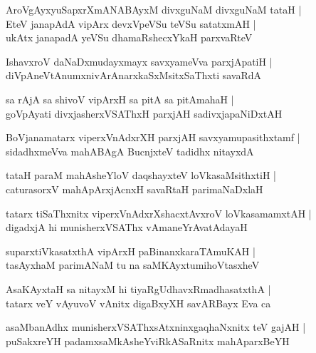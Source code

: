 \documentclass[twoside,12pt,openright]{book}
\newcounter{shloka}[chapter]
\begin{document}
\begin{shloka}
AroVgAyxyuSapxrXmANABAyxM divxguNaM divxguNaM tataH |\\
EteV janapAdA vipArx devxVpeVSu teVSu satatxmAH |\\
ukAtx janapadA yeVSu dhamaRshecxYkaH parxvaRteV
\end{shloka}

\begin{shloka}
IshavxroV daNaDxmudayxmayx savxyameVva parxjApatiH |\\
diVpAneVtAnumxnivArAnarxkaSxMsitxSaThxti savaRdA
\end{shloka}

\begin{shloka}
sa rAjA sa shivoV vipArxH sa pitA sa pitAmahaH |\\
goVpAyati divxjasherxVSAThxH parxjAH sadivxjapaNiDxtAH
\end{shloka}

\begin{shloka}
BoVjanamatarx viperxVnAdxrXH parxjAH savxyamupasithxtamf |\\
sidadhxmeVva mahABAgA BucnjxteV tadidhx nitayxdA
\end{shloka}

\begin{shloka}
tataH paraM mahAsheYloV daqshayxteV loVkasaMsithxtiH |\\
caturasorxV mahApArxjAcnxH savaRtaH parimaNaDxlaH 
\end{shloka}

\begin{shloka}
tatarx tiSaThxnitx viperxVnAdxrXshacxtAvxroV loVkasamamxtAH |\\
digadxjA hi munisherxVSAThx vAmaneYrAvatAdayaH 
\end{shloka}

\begin{shloka}
suparxtiVkasatxthA vipArxH paBinanxkaraTAmuKAH |\\
tasAyxhaM parimANaM tu na saMKAyxtumihoVtasxheV 
\end{shloka}

\begin{shloka}
AsaKAyxtaH sa nitayxM hi tiyaRgUdhavxRmadhasatxthA |\\
tatarx veY vAyuvoV vAnitx digaBxyXH savARBayx Eva ca
\end{shloka}

\begin{shloka}
asaMbanAdhx munisherxVSAThxsAtxninxgaqhaNxnitx teV gajAH |\\
puSakxreYH padamxsaMkAsheYviRkASaRnitx mahAparxBeYH 
\end{shloka}
\end{document}
